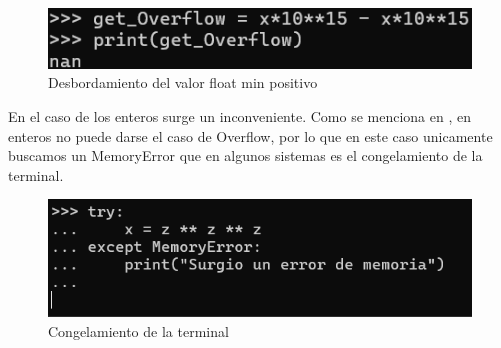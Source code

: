 \documentclass[12pt]{article}
\begin{document}
\begin{figure}[H]
\centering
\includegraphics[width=1\textwidth]{./inFiles/Figures/Cap3.png}
\caption{Desbordamiento del valor float min positivo}
\end{figure}

En el caso de los enteros surge un inconveniente. Como se menciona en \cite{python}, en enteros no puede darse el caso de Overflow, por lo que en este caso unicamente buscamos un MemoryError que en algunos sistemas es el congelamiento de la terminal.
\begin{figure}[H]
\centering
\includegraphics[width=1\textwidth]{./inFiles/Figures/Cap4.png}
\caption{Congelamiento de la terminal}
\end{figure}

\vspace{0.5cm}


\vspace{0.5cm}


\renewcommand{\refname}{\MakeUppercase{REFERENCIAS}}


\end{document}
